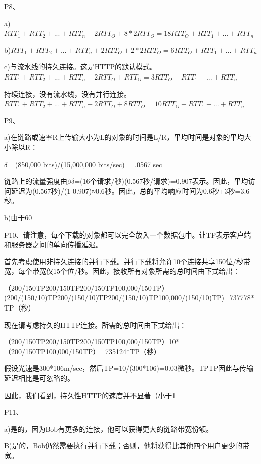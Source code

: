 \documentclass[11pt,UTF8,twoside]{article}
\begin{document}
	P8、
	
	a)$RTT_1+RTT_2+...+RTT_n+2RTT_O+8*2RTT_O=18RTT_O+RTT_1+...+RTT_n$
	
	b)$RTT_1+RTT_2+...+RTT_n+2RTT_O+2*2RTT_O=6RTT_O+RTT_1+...+RTT_n$
	
	c)与流水线的持久连接。这是HTTP的默认模式。$RTT_1+RTT_2+...+RTT_n+2RTT_O+RTT_O=3RTT_O+RTT_1+...+RTT_n$
	
	持续连接，没有流水线，没有并行连接。$RTT_1+RTT_2+...+RTT_n+2RTT_O+8RTT_O=10RTT_O+RTT_1+...+RTT_n$
	
	P9、
	
	a)在链路或速率R上传输大小为L的对象的时间是L/R，平均时间是对象的平均大小除以R：
	
	$\delta$= (850,000 bits)/(15,000,000 bits/sec) = .0567 sec 
	
	链路上的流量强度由$\beta \delta$=(16个请求/秒)(0.567秒/请求)=0.907表示。因此，平均访问延迟为(0.567秒)/(1-0.907)≈0.6秒。因此，总的平均响应时间为0.6秒+3秒=3.6秒。
	
	b)由于60%
	
	P10、请注意，每个下载的对象都可以完全放入一个数据包中。让TP表示客户端和服务器之间的单向传播延迟。
	
	首先考虑使用非持久连接的并行下载。并行下载将允许10个连接共享150位/秒带宽，每个带宽仅15个位/秒。因此，接收所有对象所需的总时间由下式给出：
	
	（200/150TP200/150TP200/150TP100,000/150TP）(200/(150/10)TP200/(150/10)TP200/(150/10)TP100,000/(150/10)TP)=737778*TP（秒）
	
	现在请考虑持久的HTTP连接。所需的总时间由下式给出：
	
	（200/150TP200/150TP200/150TP100,000/150TP）10*（200/150TP100,000/150TP）=735124*TP（秒）
	
	假设光速是300*106m/sec，然后TP=10/(300*106)=0.03微秒。TPTP因此与传输延迟相比是可忽略的。
	
	因此，我们看到，持久性HTTP的速度并不显著（小于1%
	
	P11、
	
	a)是的，因为Bob有更多的连接，他可以获得更大的链路带宽份额。
	
	B)是的，Bob仍然需要执行并行下载；否则，他将获得比其他四个用户更少的带宽。
	
\end{document}
